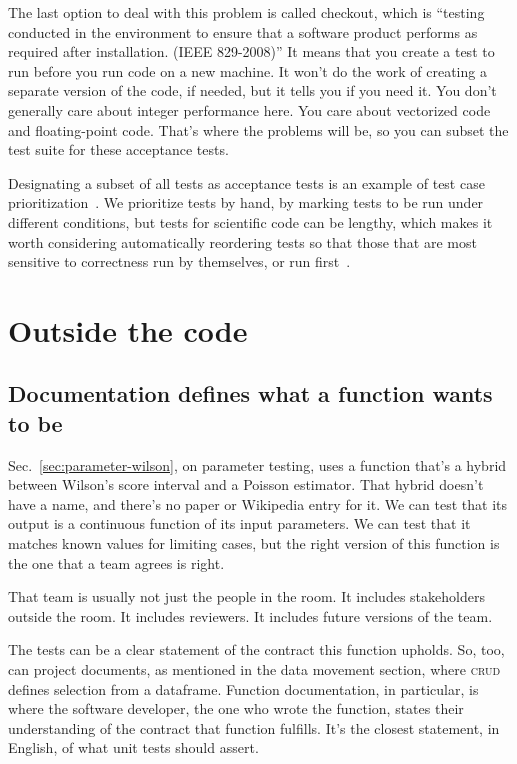 \documentclass[fleqn,10pt]{olplainarticle}
\begin{document}
The last option to deal with this problem is called checkout,
which is ``testing conducted in the environment to ensure that a software product performs as required after installation. (IEEE 829-2008)'' It means that you create a test to run before you
run code on a new machine. It won't do the work of creating
a separate version of the code, if needed, but it tells you if
you need it. You don't generally care about integer performance
here. You care about vectorized code and floating-point code.
That's where the problems will be, so you can subset the test
suite for these acceptance tests.

Designating a subset of all tests as acceptance tests is an
example of test case prioritization~\cite{rothermel1999test}.
We prioritize tests by hand, by marking tests to be run under
different conditions, but tests for scientific code can be lengthy,
which makes it worth considering automatically reordering tests
so that those that are most sensitive to correctness run by 
themselves, or run first~\cite{yoo2012regression}.


\section{Outside the code}\label{sec:outside-code}

\subsection{Documentation defines what a function wants to be}

Sec.~\ref{sec:parameter-wilson}, on parameter testing, uses a function that's a hybrid
between Wilson's score interval and a Poisson estimator. That hybrid
doesn't have a name, and there's no paper or Wikipedia entry for it.
We can test that its output is a continuous function of its input
parameters. We can test that it matches known values for limiting cases,
but the right version of this function is the one that a team agrees
is right.

That team is usually not just the people in the room. It includes stakeholders
outside the room. It includes reviewers. It includes future versions of the team.

The tests can be a clear statement of the contract this function upholds.
So, too, can project documents, as mentioned in the data movement section,
where \textsc{crud} defines selection from a dataframe. 
Function documentation, in particular, is where the software
developer, the one who wrote the function, states their understanding
of the contract that function fulfills. It's the closest statement,
in English, of what unit tests should assert.
\end{document}
